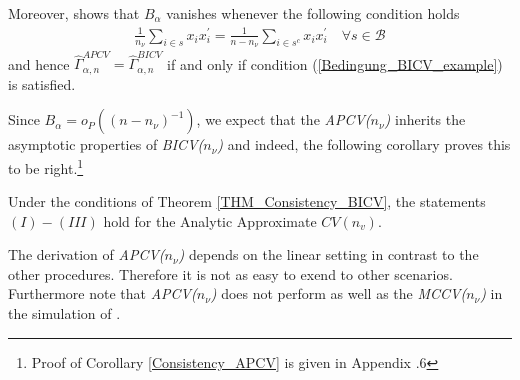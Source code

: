 \documentclass[Research_Module_ES.tex]{subfiles}
\begin{document}
Moreover, \cite{shao} shows that $B_\alpha$ vanishes whenever the following condition holds
\begin{align}
\label{Bedingung_BICV_example}
	\frac{1}{n_\nu}\sum_{i\in s}x_i x_i^\prime=\frac{1}{n-n_\nu}\sum_{i\in s^c}x_i x_i^\prime\quad \forall s\in\mathcal{B}
\end{align}
and hence $\hat{\Gamma}_{\alpha,n}^{APCV}=\hat{\Gamma}_{\alpha,n}^{BICV}$ if and only if condition (\ref{Bedingung_BICV_example}) is satisfied.

Since $B_\alpha=o_P((n-n_\nu)^{-1})$, we expect that the \textit{APCV($n_\nu$)} inherits the asymptotic properties of \textit{BICV($n_\nu$)} and indeed, the following corollary proves this to be right.\footnote{Proof of Corollary \ref{Consistency_APCV} is given in Appendix \label{AApendix}.6}
\begin{coro}
\label{Consistency_APCV}
Under the conditions of Theorem \ref{THM_Consistency_BICV}, the statements $(I)-(III)$ hold for the Analytic Approximate $CV(n_v)$.
\end{coro}
The derivation of \textit{APCV($n_\nu$)} depends on the linear setting in contrast to the other procedures. Therefore it is not as easy to exend to other scenarios.
Furthermore note that \textit{APCV($n_\nu$)} does not perform as well as the \textit{MCCV($n_\nu$)} in the simulation of \cite{shao}.
\end{document}
